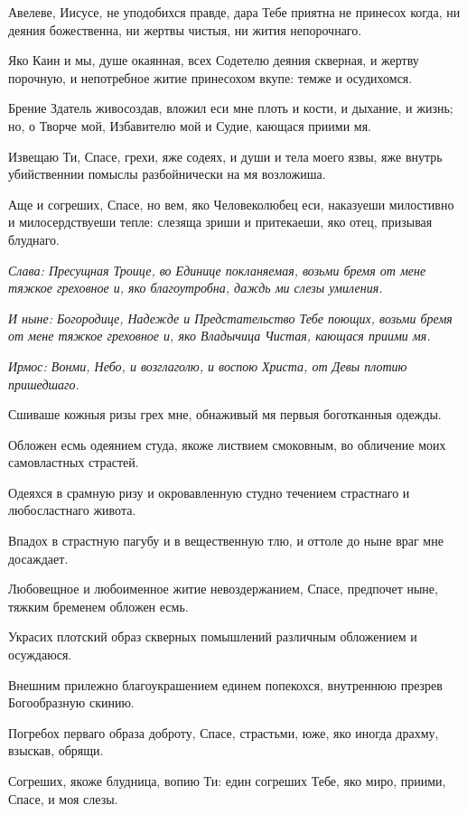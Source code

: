 Авелеве, Иисусе, не уподобихся правде, дара Тебе приятна не принесох когда, ни деяния божественна, ни жертвы чистыя, ни жития непорочнаго. 

Яко Каин и мы, душе окаянная, всех Содетелю деяния скверная, и жертву порочную, и непотребное житие принесохом вкупе: темже и осудихомся. 

Брение Здатель живосоздав, вложил еси мне плоть и кости, и дыхание, и жизнь; но, о Творче мой, Избавителю мой и Судие, кающася приими мя. 

Извещаю Ти, Спасе, грехи, яже содеях, и души и тела моего язвы, яже внутрь убийственнии помыслы разбойнически на мя возложиша. 

Аще и согреших, Спасе, но вем, яко Человеколюбец еси, наказуеши милостивно и милосердствуеши тепле: слезяща зриши и притекаеши, яко отец, призывая блуднаго. 

\itshape Слава\normalfont{}: Пресущная Троице, во Единице покланяемая, возьми бремя от мене тяжкое греховное и, яко благоутробна, даждь ми слезы умиления. 

\itshape И ныне\normalfont{}: Богородице, Надежде и Предстательство Тебе поющих, возьми бремя от мене тяжкое греховное и, яко Владычица Чистая, кающася приими мя. 


\itshape Ирмос\normalfont{}: Вонми, Небо, и возглаголю, и воспою Христа, от Девы плотию пришедшаго. 

Сшиваше кожныя ризы грех мне, обнаживый мя первыя боготканныя одежды. 

Обложен есмь одеянием студа, якоже листвием смоковным, во обличение моих самовластных страстей. 

Одеяхся в срамную ризу и окровавленную студно течением страстнаго и любосластнаго живота. 

Впадох в страстную пагубу и в вещественную тлю, и оттоле до ныне враг мне досаждает. 

Любовещное и любоименное житие невоздержанием, Спасе, предпочет ныне, тяжким бременем обложен есмь. 

Украсих плотский образ скверных помышлений различным обложением и осуждаюся. 

Внешним прилежно благоукрашением единем попекохся, внутреннюю презрев Богообразную скинию. 

Погребох перваго образа доброту, Спасе, страстьми, юже, яко иногда драхму, взыскав, обрящи. 

Согреших, якоже блудница, вопию Ти: един согреших Тебе, яко миро, приими, Спасе, и моя слезы. 

